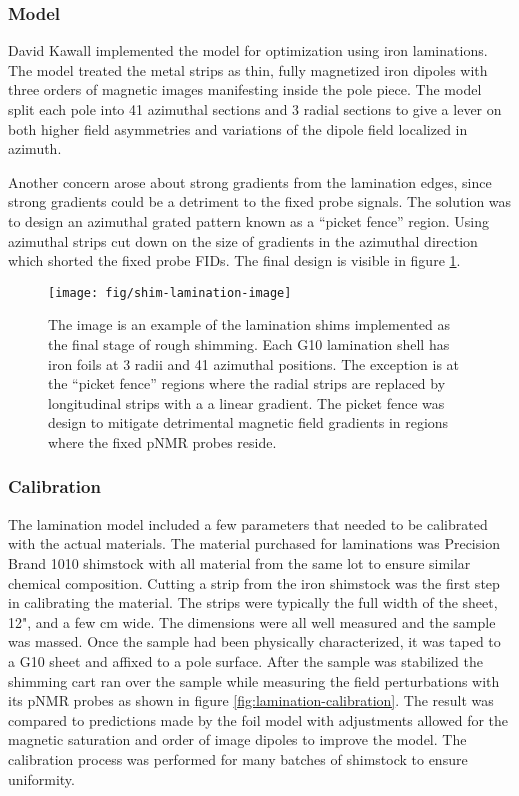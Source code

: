 \subsubsection{Model}

David Kawall implemented the model for optimization using iron laminations.  The model treated the metal strips as thin, fully magnetized iron dipoles with three orders of magnetic images manifesting inside the pole piece.  The model split each pole into 41 azimuthal sections and 3 radial sections to give a lever on both higher field asymmetries and variations of the dipole field localized in azimuth.  

Another concern arose about strong gradients from the lamination edges, since strong gradients could be a detriment to the fixed probe signals.  The solution was to design an azimuthal grated pattern known as a ``picket fence'' region.  Using azimuthal strips cut down on the size of gradients in the azimuthal direction which shorted the fixed probe FIDs. The final design is visible in figure \ref{fig:shim-lamination-image}.

\begin{figure}
\centering
\texttt{[image: fig/shim-lamination-image]}
\caption{
    The image is an example of the lamination shims implemented as the final stage of rough shimming.  Each G10 lamination shell has iron foils at 3 radii and 41 azimuthal positions.  The exception is at the ``picket fence'' regions where the radial strips are replaced by longitudinal strips with a a linear gradient.  The picket fence was design to mitigate detrimental magnetic field gradients in regions where the fixed pNMR probes reside.
    \label{fig:shim-lamination-image}
}
\end{figure}

\subsubsection{Calibration}

The lamination model included a few parameters that needed to be calibrated with the actual materials.  The material purchased for laminations was Precision Brand 1010 shimstock with all material from the same lot to ensure similar chemical composition.  Cutting a strip from the iron shimstock was the first step in calibrating the material.  The strips were typically the full width of the sheet, 12", and a few \si{\centi\meter} wide.  The dimensions were all well measured and the sample was massed.  Once the sample had been physically characterized, it was taped to a G10 sheet and affixed to a pole surface.  After the sample was stabilized the shimming cart ran over the sample while measuring the field perturbations with its pNMR probes as shown in figure \ref{fig:lamination-calibration}.  The result was compared to predictions made by the foil model with adjustments allowed for the magnetic saturation and order of image dipoles to improve the model.  The calibration process was performed for many batches of shimstock to ensure uniformity.


